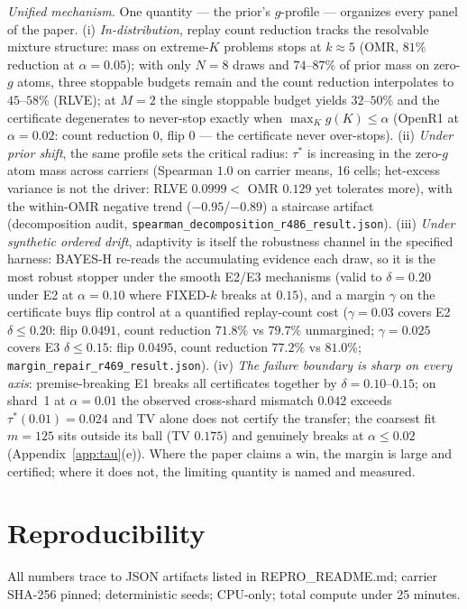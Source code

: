 \documentclass{article}
\theoremstyle{definition}
\theoremstyle{remark}
\begin{document}
\emph{Unified mechanism.} One quantity --- the prior's $g$-profile ---
organizes every panel of the paper. (i) \emph{In-distribution}, replay count
reduction tracks the resolvable mixture structure: mass on extreme-$K$
problems stops at $k\approx5$ (OMR, $81\%$ reduction at $\alpha{=}0.05$);
with only $N{=}8$ draws and $74$--$87\%$ of prior mass on zero-$g$
atoms, three stoppable budgets remain and the count reduction interpolates to
$45$--$58\%$ (RLVE); at $M{=}2$ the single stoppable budget yields
$32$--$50\%$ and the certificate degenerates to never-stop exactly when
$\max_K g(K)\le\alpha$ (OpenR1 at $\alpha{=}0.02$: count reduction $0$, flip $0$
--- the certificate never over-stops). (ii) \emph{Under prior shift},
the same profile sets the critical radius: $\tau^*$ is increasing in the
zero-$g$ atom mass across carriers (Spearman $1.0$ on carrier means, 16
cells; het-excess variance is not the driver: RLVE $0.0999<$ OMR $0.129$
yet tolerates more), with the within-OMR negative trend
($-0.95$/$-0.89$) a staircase artifact (decomposition audit,
\texttt{spearman\_decomposition\_r486\_result.json}). (iii) \emph{Under
synthetic ordered drift}, adaptivity is itself the robustness channel in the
specified harness: BAYES-H re-reads the accumulating evidence each draw, so it
is the most robust stopper under the smooth E2/E3 mechanisms (valid to $\delta{=}0.20$
under E2 at $\alpha{=}0.10$ where FIXED-$k$ breaks at $0.15$), and a
margin $\gamma$ on the certificate buys flip control at a quantified replay-count
cost ($\gamma{=}0.03$ covers E2 $\delta\le0.20$: flip $0.0491$, count reduction
$71.8\%$ vs $79.7\%$ unmargined; $\gamma{=}0.025$ covers E3
$\delta\le0.15$: flip $0.0495$, count reduction $77.2\%$ vs $81.0\%$;
\texttt{margin\_repair\_r469\_result.json}). (iv) \emph{The failure
boundary is sharp on every axis}: premise-breaking E1 breaks all
certificates together by $\delta{=}0.10$--$0.15$; on shard~1 at
$\alpha{=}0.01$ the observed cross-shard mismatch $0.042$ exceeds
$\tau^*(0.01){=}0.024$ and TV alone does not certify the transfer; the
coarsest fit $m{=}125$ sits outside its ball (TV $0.175$) and genuinely
breaks at $\alpha\le0.02$ (Appendix~\ref{app:tau}(e)). Where the paper
claims a win, the margin is large and certified; where it does not, the
limiting quantity is named and measured.

\section{Reproducibility}
\label{app:repro}
All numbers trace to JSON artifacts listed in REPRO\_README.md; carrier
SHA-256 pinned; deterministic seeds; CPU-only; total compute under 25 minutes.
\end{document}
